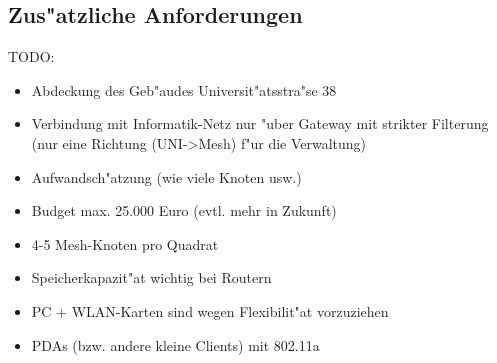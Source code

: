 \subsection{Zus"atzliche Anforderungen}
TODO: 
\begin{itemize}
	\item Abdeckung des Geb"audes Universit"atsstra"se 38
	\item Verbindung mit Informatik-Netz nur "uber Gateway
	mit strikter Filterung (nur eine Richtung (UNI->Mesh)
	f"ur die Verwaltung)
	\item Aufwandsch"atzung (wie viele Knoten usw.)
	\item Budget max. 25.000 Euro (evtl. mehr in Zukunft)
	\item 4-5 Mesh-Knoten pro Quadrat 
	\item Speicherkapazit"at wichtig bei Routern
	\item PC + WLAN-Karten sind wegen Flexibilit"at vorzuziehen
	\item PDAs (bzw. andere kleine Clients) mit 802.11a
\end{itemize}


